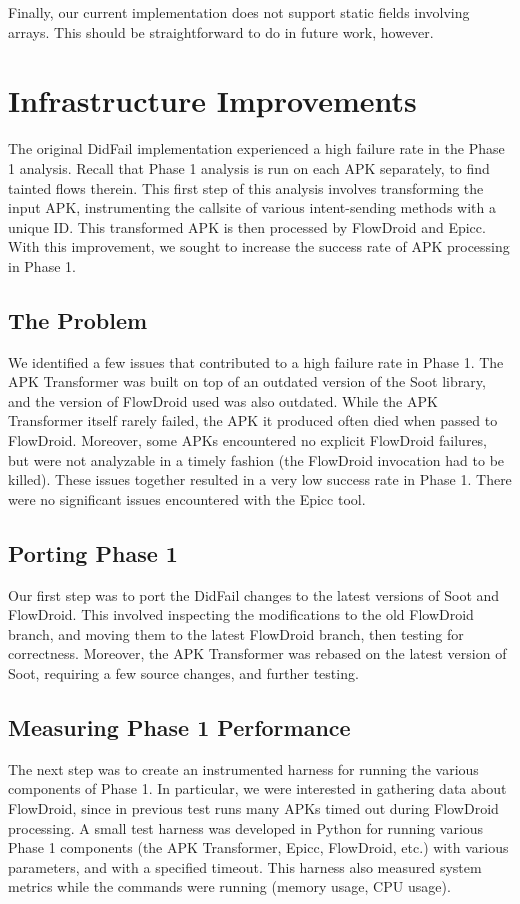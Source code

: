Finally, our current implementation does not support static fields involving arrays. This should be straightforward to do in future work, however.


\section{Infrastructure Improvements}
\label{sec:infrastructure}
The original DidFail implementation experienced a high failure rate in the Phase 1 analysis.  Recall that Phase 1 analysis is run on each APK separately, to find tainted flows therein.  This first step of this analysis involves transforming the input APK, instrumenting the callsite of various intent-sending methods with a unique ID.  This transformed APK is then processed by FlowDroid and Epicc.  With this improvement, we sought to increase the success rate of APK processing in Phase 1.

\subsection{The Problem}
We identified a few issues that contributed to a high failure rate in Phase 1.  The APK Transformer was built on top of an outdated version of the Soot library, and the version of FlowDroid used was also outdated.  While the APK Transformer itself rarely failed, the APK it produced often died when passed to FlowDroid.  Moreover, some APKs encountered no explicit FlowDroid failures, but were not analyzable in a timely fashion (the FlowDroid invocation had to be killed).   These issues together resulted in a very low success rate in Phase 1.  There were no significant issues encountered with the Epicc tool.

\subsection{Porting Phase 1}
Our first step was to port the DidFail changes to the latest versions of Soot and FlowDroid.  This involved inspecting the modifications to the old FlowDroid branch, and moving them to the latest FlowDroid branch, then testing for correctness.  Moreover, the APK Transformer was rebased on the latest version of Soot, requiring a few source changes, and further testing.

\subsection{Measuring Phase 1 Performance}
The next step was to create an instrumented harness for running the various components of Phase 1.  In particular, we were interested in gathering data about FlowDroid, since in previous test runs many APKs timed out during FlowDroid processing.  A small test harness was developed in Python for running various Phase 1 components (the APK Transformer, Epicc, FlowDroid, etc.) with various parameters, and with a specified timeout.  This harness also measured system metrics while the commands  were running (memory usage, CPU usage).  

